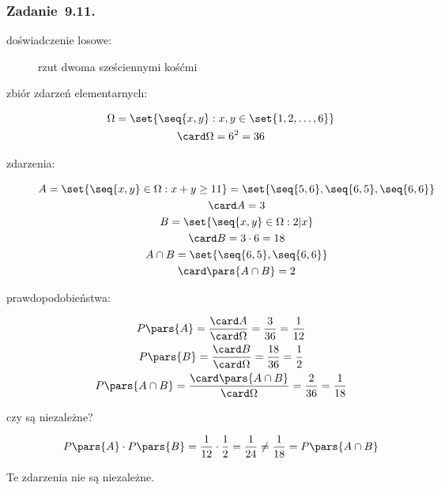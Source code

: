 \subsubsection*{Zadanie~9.11.}
\begin{description}
    \item[doświadczenie losowe:] rzut dwoma sześciennymi kośćmi
    \item[zbiór zdarzeń elementarnych:]
        \begin{gather*}
            \Omega = \set{\seq{x, y} : x, y \in \set{1, 2, \ldots, 6}}\\
            \card\Omega = 6^2 = 36
        \end{gather*}
    \item[zdarzenia:]
        \begin{gather*}
            A = \set{\seq{x, y} \in \Omega : x + y \geq 11}
                = \set{\seq{5, 6}, \seq{6, 5}, \seq{6, 6}}\\
            \card A = 3\\
            B = \set{\seq{x, y} \in \Omega : 2 \vert x}\\
            \card B = 3 \cdot 6 = 18\\
            A \cap B = \set{\seq{6, 5}, \seq{6, 6}}\\
            \card\pars{A \cap B} = 2
        \end{gather*}
    \item[prawdopodobieństwa:]
        \begin{gather*}
            P\pars{A} = \frac{\card A}{\card\Omega}
                = \frac{3}{36}
                = \frac{1}{12}\\
            P\pars{B} = \frac{\card B}{\card\Omega}
                = \frac{18}{36}
                = \frac{1}{2}\\
            P\pars{A \cap B}
                = \frac{\card\pars{A \cap B}}{\card\Omega}
                = \frac{2}{36}
                = \frac{1}{18}
        \end{gather*}
    \item[czy są niezależne?]
        \begin{equation*}
            P\pars{A} \cdot P\pars{B} = \frac{1}{12} \cdot \frac{1}{2}
                = \frac{1}{24}
                \neq \frac{1}{18}
                = P\pars{A \cap B}
        \end{equation*}
\end{description}
Te zdarzenia nie są niezależne.
